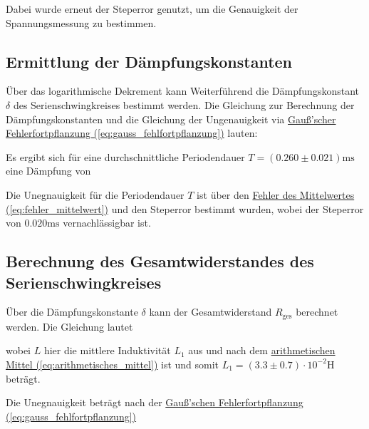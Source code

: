 Dabei wurde erneut der Steperror genutzt, um die Genauigkeit der Spannungsmessung zu bestimmen.


\subsection{Ermittlung der Dämpfungskonstanten}
Über das logarithmische Dekrement kann Weiterführend die Dämpfungskonstant $\delta$ des Serienschwingkreises bestimmt werden. Die Gleichung zur Berechnung der Dämpfungskonstanten und die Gleichung der Ungenauigkeit via \hyperref[eq:gauss_fehlfortpflanzung]{Gauß'scher Fehlerfortpflanzung (\ref*{eq:gauss_fehlfortpflanzung})} lauten:

Es ergibt sich für eine durchschnittliche Periodendauer $T = (0.260 \pm 0.021) \mathrm{ms}$ eine Dämpfung von 

Die Unegnauigkeit für die Periodendauer $T$ ist über den \hyperref[eq:fehler_mittelwert]{Fehler des Mittelwertes (\ref*{eq:fehler_mittelwert})} und den Steperror bestimmt wurden, wobei der Steperror von $0.020\mathrm{ms}$ vernachlässigbar ist. 

\subsection{Berechnung des Gesamtwiderstandes des Serienschwingkreises}
Über die Dämpfungskonstante $\delta$ kann der Gesamtwiderstand $R_\text{ges}$ berechnet werden. Die Gleichung lautet

wobei $L$ hier die mittlere Induktivität $L_1$ aus  und  nach dem \hyperref[eq:arithmetisches_mittel]{arithmetischen Mittel (\ref*{eq:arithmetisches_mittel})} ist und somit $L_1 = (3.3 \pm 0.7) \cdot 10^{-2}\mathrm{H}$ beträgt.

Die Unegnauigkeit beträgt nach der \hyperref[eq:gauss_fehlfortpflanzung]{Gauß'schen Fehlerfortpflanzung (\ref*{eq:gauss_fehlfortpflanzung})}

